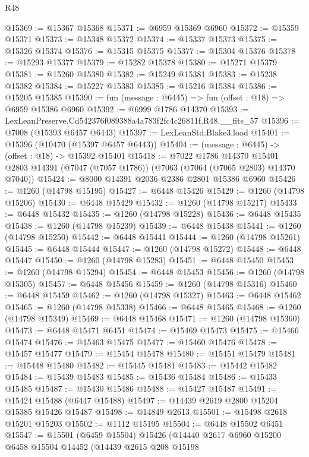 \begin{lexlean}{R48}
\begin{coremodule}
@15369 := @15367 @15368
@15371 := @6959 @15369 @6960
@15372 := @15359 @15371
@15373 := @15348 @15372
@15374 := @15337 @15373
@15375 := @15326 @15374
@15376 := @15315 @15375
@15377 := @15304 @15376
@15378 := @15293 @15377
@15379 := @15282 @15378
@15380 := @15271 @15379
@15381 := @15260 @15380
@15382 := @15249 @15381
@15383 := @15238 @15382
@15384 := @15227 @15383
@15385 := @15216 @15384
@15386 := @15205 @15385
@15390 := fun (message : @6445) => fun (offset : @18) => @6959 @15386 @6960
@15392 := @6999 @1786 @14370
@15393 := LexLeanPreserve.Cd542376f089388a4a783f2fc4c26811f.R48.__fits_57
@15396 := @7008 (@15393 @6457 @6443)
@15397 := LexLeanStd.Blake3.load
@15401 := @15396 (@10470 (@15397 @6457 @6443))
@15404 := (message : @6445) -> (offset : @18) -> @15392 @15401
@15418 := @7022
    @1786
    @14370
    @15401
    @2803
    @14391
    (@7047 (@7057 @1786))
    (@7063 (@7064 (@7065 @2803) @14370 @7040))
@15424 := @8000 @14391 @2036 @2386 @2801 @15386 @6960
@15426 := @1260 (@14798 @15195)
@15427 := @6448 @15426
@15429 := @1260 (@14798 @15206)
@15430 := @6448 @15429
@15432 := @1260 (@14798 @15217)
@15433 := @6448 @15432
@15435 := @1260 (@14798 @15228)
@15436 := @6448 @15435
@15438 := @1260 (@14798 @15239)
@15439 := @6448 @15438
@15441 := @1260 (@14798 @15250)
@15442 := @6448 @15441
@15444 := @1260 (@14798 @15261)
@15445 := @6448 @15444
@15447 := @1260 (@14798 @15272)
@15448 := @6448 @15447
@15450 := @1260 (@14798 @15283)
@15451 := @6448 @15450
@15453 := @1260 (@14798 @15294)
@15454 := @6448 @15453
@15456 := @1260 (@14798 @15305)
@15457 := @6448 @15456
@15459 := @1260 (@14798 @15316)
@15460 := @6448 @15459
@15462 := @1260 (@14798 @15327)
@15463 := @6448 @15462
@15465 := @1260 (@14798 @15338)
@15466 := @6448 @15465
@15468 := @1260 (@14798 @15349)
@15469 := @6448 @15468
@15471 := @1260 (@14798 @15360)
@15473 := @6448 @15471 @6451
@15474 := @15469 @15473
@15475 := @15466 @15474
@15476 := @15463 @15475
@15477 := @15460 @15476
@15478 := @15457 @15477
@15479 := @15454 @15478
@15480 := @15451 @15479
@15481 := @15448 @15480
@15482 := @15445 @15481
@15483 := @15442 @15482
@15484 := @15439 @15483
@15485 := @15436 @15484
@15486 := @15433 @15485
@15487 := @15430 @15486
@15488 := @15427 @15487
@15491 := @15424 @15488 (@6447 @15488)
@15497 := @14439 @2619 @2800 @15204 @15385 @15426 @15487
@15498 := @14849 @2613
@15501 := @15498 @2618 @15201 @15203
@15502 := @1112 @15195
@15504 := @6448 @15502 @6451
@15547 := @15501
    (@6459 @15504)
    @15426
    (@14440
      @2617
      @6960
      @15200
      @6458
      @15504
      @14452
      (@14439
        @2615
        @208
        @15198

\end{coremodule}
\end{lexlean}
